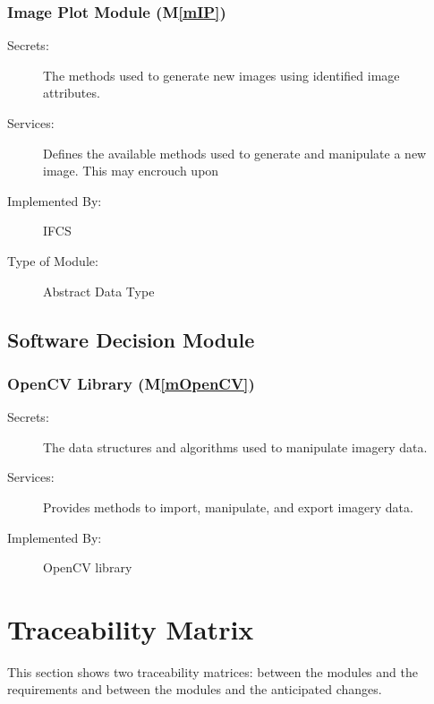\documentclass[12pt, titlepage]{article}
\newcommand{\mref}[1]{M\ref{#1}}
\begin{document}
\subsubsection{Image Plot Module (\mref{mIP})}
\begin{description}
\item[Secrets:]The methods used to generate  new images using identified image attributes.
\item[Services:]Defines the available methods used to generate and manipulate a new image. This may encrouch upon
\item[Implemented By:] IFCS
\item[Type of Module:] Abstract Data Type
\end{description}

\subsection{Software Decision Module}

\subsubsection{OpenCV Library (\mref{mOpenCV})}
\begin{description}
\item[Secrets:] The data structures and algorithms used to manipulate imagery data.
\item[Services:] Provides methods to import, manipulate, and export imagery data.
\item[Implemented By:] OpenCV library
\end{description}

\section{Traceability Matrix} \label{SecTM}

This section shows two traceability matrices: between the modules and the
requirements and between the modules and the anticipated changes.
\end{document}
